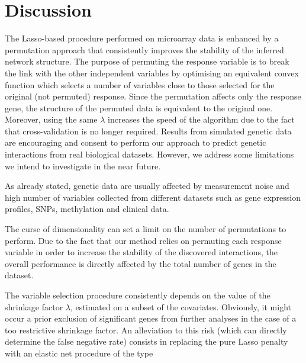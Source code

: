 \section{Discussion} \label{discussion}
The Lasso-based procedure performed on microarray data is enhanced by a permutation approach that consistently improves the stability of the inferred network structure. The purpose of permuting the response variable is to break the link with the other independent variables by optimising an equivalent convex function which selects a number of variables close to those selected for the original (not permuted) response. Since the permutation affects only the response gene, the structure of the permuted data is equivalent to the original one. Moreover, using the same $\lambda$ increases the speed of the algorithm due to the fact that cross-validation is no longer required. 
Results from simulated genetic data are encouraging and consent to perform our approach to predict genetic interactions from real biological datasets. However, we address some limitations we intend to investigate in the near future. 

As already stated, genetic data are usually affected by measurement noise and high number of variables collected from different datasets such as gene expression profiles, SNPs, methylation and clinical data. 

The curse of dimensionality can set a limit on the number of permutations to perform. Due to the fact that our method relies on permuting each response variable in order to increase the stability of the discovered interactions, the overall performance is directly affected by the total number of genes in the dataset. 


The variable selection procedure consistently depends on the value of the shrinkage factor $\lambda$, estimated on a subset of the covariates. Obviously, it might occur a prior exclusion of significant genes from further analyses in the case of a too restrictive shrinkage factor. An alleviation to this risk (which can  directly determine the false negative rate) consists in replacing the pure Lasso penalty with an elastic net procedure of the type

